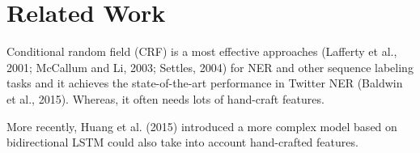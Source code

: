 \section{Related Work}
\label{sec:related}
Conditional random field (CRF) is a most effective approaches (Lafferty et al., 2001; McCallum
and Li, 2003; Settles, 2004) for NER and other sequence labeling tasks and it achieves the state-of-the-art performance in Twitter NER (Baldwin et al., 2015). 
Whereas, it often needs lots of hand-craft features.

 
More recently, Huang et al. (2015) introduced a more complex model based on bidirectional LSTM could also take into account hand-crafted features.  
